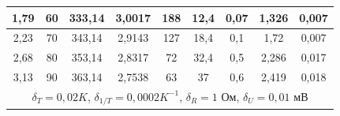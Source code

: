 \documentclass[a4paper, 12pt]{article}%
\begin{document}
\begin{table}[h]
\begin{tabular}{|c|c|c|c|c|c|c|c|c|}
1,79    & 60     & 333,14 & 3,0017            & 188     & 12,4                                                & 0,07                                                         & 1,326                                                                             & 0,007                                              \\ \hline
2,23    & 70     & 343,14 & 2,9143            & 127     & 18,4                                                & 0,1                                                          & 1,72                                                                              & 0,007                                              \\ \hline
2,68    & 80     & 353,14 & 2,8317            & 72      & 32,4                                                & 0,5                                                          & 2,286                                                                             & 0,017                                              \\ \hline
3,13    & 90     & 363,14 & 2,7538            & 63      & 37                                                  & 0,6                                                          & 2,419                                                                             & 0,018                                              \\ \hline
\multicolumn{9}{|c|}{$\delta_T = 0,02 K$,   $\delta_{1/T} = 0,0002 K^{-1}$, $\delta_R = 1$ Ом, $\delta_U = 0,01$ мВ}                                                                                                                                                                                                  \\ \hline
\end{tabular}
\end{table}
\end{document}
